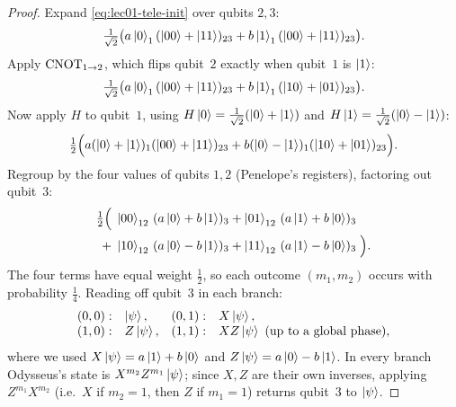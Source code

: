 \begin{proof}
Expand \eqref{eq:lec01-tele-init} over qubits $2,3$:
\[
  \tfrac{1}{\sqrt2}\bigl(a\ket{0}_1(\ket{00}+\ket{11})_{23}
      +b\ket{1}_1(\ket{00}+\ket{11})_{23}\bigr).
\]
Apply $\mathrm{CNOT}_{1\to2}$, which flips qubit~$2$ exactly when qubit~$1$ is $\ket{1}$:
\[
  \tfrac{1}{\sqrt2}\bigl(a\ket{0}_1(\ket{00}+\ket{11})_{23}
      +b\ket{1}_1(\ket{10}+\ket{01})_{23}\bigr).
\]
Now apply $H$ to qubit~$1$, using $H\ket{0}=\tfrac{1}{\sqrt2}(\ket{0}+\ket{1})$ and
$H\ket{1}=\tfrac{1}{\sqrt2}(\ket{0}-\ket{1})$:
\[
  \tfrac12\Bigl(a(\ket{0}+\ket{1})_1(\ket{00}+\ket{11})_{23}
      +b(\ket{0}-\ket{1})_1(\ket{10}+\ket{01})_{23}\Bigr).
\]
Regroup by the four values of qubits $1,2$ (Penelope's registers), factoring out qubit~$3$:
\begin{equation}\label{eq:lec01-tele-grouped}
\begin{aligned}
  \tfrac12\Bigl(\;
    &\ket{00}_{12}\,(a\ket{0}+b\ket{1})_3
    +\ket{01}_{12}\,(a\ket{1}+b\ket{0})_3\\
    +\;&\ket{10}_{12}\,(a\ket{0}-b\ket{1})_3
    +\ket{11}_{12}\,(a\ket{1}-b\ket{0})_3\;\Bigr).
\end{aligned}
\end{equation}
The four terms have equal weight $\tfrac12$, so each outcome $(m_1,m_2)$ occurs with
probability $\tfrac14$. Reading off qubit~$3$ in each branch:
\[
  \begin{array}{llll}
    (0,0):&\ket{\psi}, & (0,1):&X\ket{\psi},\\
    (1,0):&Z\ket{\psi}, & (1,1):&XZ\ket{\psi} \ (\text{up to a global phase}),
  \end{array}
\]
where we used $X\ket{\psi}=a\ket{1}+b\ket{0}$ and $Z\ket{\psi}=a\ket{0}-b\ket{1}$.
In every branch Odysseus's state is $X^{m_2}Z^{m_1}\ket{\psi}$; since $X,Z$ are their own
inverses, applying $Z^{m_1}X^{m_2}$ (i.e.\ $X$ if $m_2=1$, then $Z$ if $m_1=1$)
returns qubit~$3$ to $\ket{\psi}$.
\end{proof}

